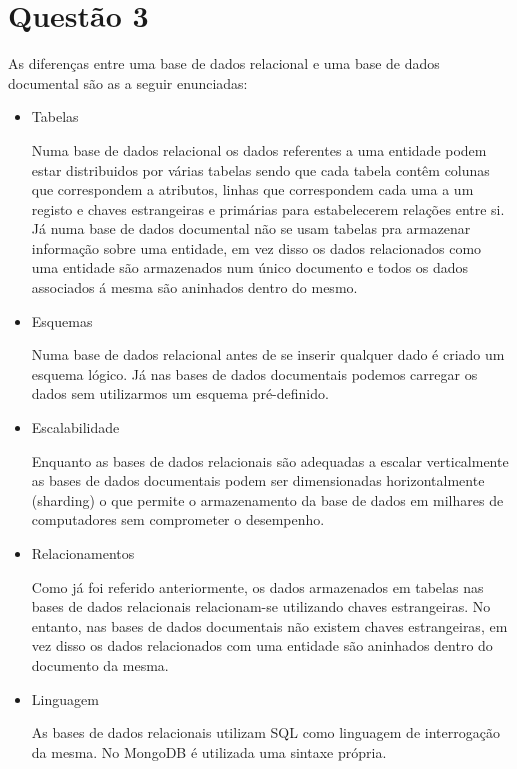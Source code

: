 \section{Questão 3}


As diferenças entre uma base de dados relacional e uma base de dados documental são as a seguir enunciadas:
\begin{itemize}
 \item Tabelas\hfill\newline
 \par Numa  base de dados relacional os dados referentes a uma entidade podem estar distribuidos por várias tabelas sendo que cada tabela contêm colunas que correspondem a atributos, linhas que correspondem cada uma a um registo e chaves estrangeiras e primárias para estabelecerem relações entre si. Já numa base de dados documental não se usam tabelas pra armazenar informação sobre uma entidade, em vez disso os dados relacionados como uma entidade são armazenados num único documento e todos os dados associados á mesma são aninhados dentro do mesmo.\hfill\newline
 \item Esquemas\hfill\newline
 \par Numa base de dados relacional antes de se inserir qualquer dado é criado um esquema lógico. Já nas bases de dados documentais podemos carregar os dados sem utilizarmos um esquema pré-definido.\hfill\newline
 \item Escalabilidade\hfill\newline
 \par Enquanto as bases de dados relacionais são adequadas a escalar verticalmente as bases de dados documentais podem ser dimensionadas horizontalmente (sharding) o que permite o armazenamento da base de dados em milhares de computadores sem comprometer o desempenho.\hfill\newline
 \item Relacionamentos\hfill\newline
 \par Como já foi referido anteriormente, os dados armazenados em tabelas nas bases de dados relacionais relacionam-se utilizando chaves estrangeiras. No entanto, nas bases de dados documentais não existem chaves estrangeiras, em vez disso os dados relacionados com uma entidade são aninhados dentro do documento da mesma.\hfill\newline
\item Linguagem \hfill\newline
 \par As bases de dados relacionais utilizam SQL como linguagem de interrogação da mesma. No MongoDB é utilizada uma sintaxe própria.
\end{itemize}
